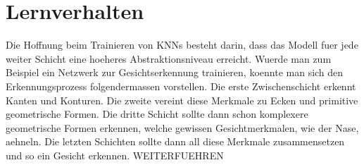 \section{Lernverhalten}
Die Hoffnung beim Trainieren von KNNs besteht darin, dass das Modell fuer jede
weiter Schicht eine hoeheres Abstraktionsniveau erreicht. Wuerde man zum
Beispiel ein Netzwerk zur Gesichtserkennung trainieren, koennte man sich den
Erkennungsprozess folgendermassen vorstellen. Die erste Zwischenschicht erkennt
Kanten und Konturen. Die zweite vereint diese Merkmale zu Ecken und primitive
geometrische Formen. Die dritte Schicht sollte dann schon komplexere
geometrische Formen erkennen, welche gewissen Gesichtmerkmalen, wie der Nase, aehneln. Die letzten Schichten sollte dann all diese
Merkmale zusammensetzen und so ein Gesicht erkennen.
WEITERFUEHREN


